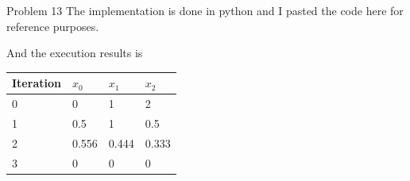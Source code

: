 \documentclass[10pt]{article}
\begin{document}
\begin{section}{Problem 13}
    The implementation is done in python and I pasted the code here for reference purposes. 
    
    
    And the execution results is 

   	\begin{tabular}{llll}
   		\hline
   		Iteration & $x_0$ & $x_1$& $x_2$ \\
   		\hline\hline
   		0 & 0     & 1     & 2     \\
   		1 & 0.5   & 1     & 0.5   \\
   		2 & 0.556 & 0.444 & 0.333 \\
   		3 & 0     & 0     & 0    
   	\end{tabular}

\end{section}
\end{document}
